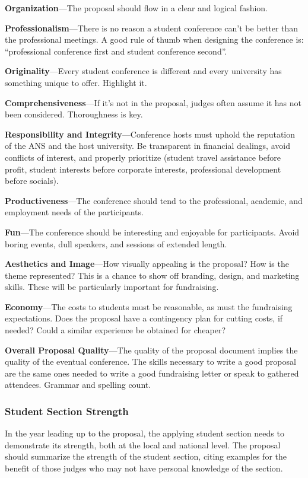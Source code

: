 \documentclass[12pt]{article}
\begin{document}
\textbf{Organization}---The proposal should flow in a clear and logical fashion.

\textbf{Professionalism}---There is no reason a student conference can’t be better than the professional meetings. A good rule of thumb when designing the conference is: “professional conference first and student conference second”.

\textbf{Originality}---Every student conference is different and every university has something unique to offer. Highlight it.

\textbf{Comprehensiveness}---If it’s not in the proposal, judges often assume it has not been considered. Thoroughness is key.

\textbf{Responsibility and Integrity}---Conference hosts must uphold the reputation of the ANS and the host university. Be transparent in financial dealings, avoid conflicts of interest, and properly prioritize (student travel assistance before profit, student interests before corporate
interests, professional development before socials).

\textbf{Productiveness}---The conference should tend to the professional, academic, and employment needs of the participants.

\textbf{Fun}---The conference should be interesting and enjoyable for participants. Avoid boring events, dull speakers, and sessions of extended length.

\textbf{Aesthetics and Image}---How visually appealing is the proposal? How is the theme represented? This is a chance to show off branding, design, and marketing skills. These will be particularly important for fundraising.

\textbf{Economy}---The costs to students must be reasonable, as must the fundraising expectations. Does the proposal have a contingency plan for cutting costs, if needed? Could a similar experience be obtained for cheaper?

\textbf{Overall Proposal Quality}---The quality of the proposal document implies the quality of the eventual conference. The skills necessary to write a good proposal are the same ones needed to write a good fundraising letter or speak to gathered attendees. Grammar and spelling count.

\subsubsection{Student Section Strength}
In the year leading up to the proposal, the applying student section needs to demonstrate its strength, both at the local and national level. The proposal should summarize the strength of the student section, citing examples for the benefit of those judges who may not have personal knowledge of the section.
\end{document}
